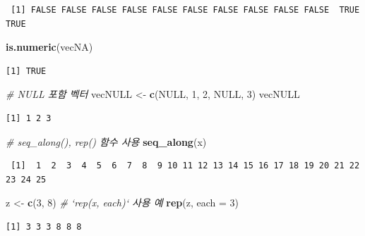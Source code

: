 \documentclass[11pt,a4paper]{book}
\newenvironment{Shaded}{\begin{snugshade}}{\end{snugshade}}
\newcommand{\KeywordTok}[1]{\textcolor[rgb]{0.13,0.29,0.53}{\textbf{#1}}}
\newcommand{\DataTypeTok}[1]{\textcolor[rgb]{0.13,0.29,0.53}{#1}}
\newcommand{\DecValTok}[1]{\textcolor[rgb]{0.00,0.00,0.81}{#1}}
\newcommand{\StringTok}[1]{\textcolor[rgb]{0.31,0.60,0.02}{#1}}
\newcommand{\CommentTok}[1]{\textcolor[rgb]{0.56,0.35,0.01}{\textit{#1}}}
\newcommand{\OtherTok}[1]{\textcolor[rgb]{0.56,0.35,0.01}{#1}}
\newcommand{\NormalTok}[1]{#1}
\theoremstyle{definition}
\theoremstyle{definition}
\theoremstyle{definition}
\theoremstyle{remark}
\begin{document}
\begin{verbatim}
 [1] FALSE FALSE FALSE FALSE FALSE FALSE FALSE FALSE FALSE FALSE  TRUE  TRUE
\end{verbatim}

\begin{Shaded}
\begin{Highlighting}[]
\KeywordTok{is.numeric}\NormalTok{(vecNA)}
\end{Highlighting}
\end{Shaded}

\begin{verbatim}
[1] TRUE
\end{verbatim}

\begin{Shaded}
\begin{Highlighting}[]
\CommentTok{# NULL 포함 벡터}
\NormalTok{vecNULL <-}\StringTok{ }\KeywordTok{c}\NormalTok{(}\OtherTok{NULL}\NormalTok{, }\DecValTok{1}\NormalTok{, }\DecValTok{2}\NormalTok{, }\OtherTok{NULL}\NormalTok{, }\DecValTok{3}\NormalTok{)}
\NormalTok{vecNULL}
\end{Highlighting}
\end{Shaded}

\begin{verbatim}
[1] 1 2 3
\end{verbatim}

\begin{Shaded}
\begin{Highlighting}[]
\CommentTok{# seq_along(), rep() 함수 사용}
\KeywordTok{seq_along}\NormalTok{(x)}
\end{Highlighting}
\end{Shaded}

\begin{verbatim}
 [1]  1  2  3  4  5  6  7  8  9 10 11 12 13 14 15 16 17 18 19 20 21 22 23 24 25
\end{verbatim}

\begin{Shaded}
\begin{Highlighting}[]
\NormalTok{z <-}\StringTok{ }\KeywordTok{c}\NormalTok{(}\DecValTok{3}\NormalTok{, }\DecValTok{8}\NormalTok{)}
\CommentTok{# `rep(x, each)` 사용 예}
\KeywordTok{rep}\NormalTok{(z, }\DataTypeTok{each =} \DecValTok{3}\NormalTok{)}
\end{Highlighting}
\end{Shaded}

\begin{verbatim}
[1] 3 3 3 8 8 8
\end{verbatim}
\end{document}
